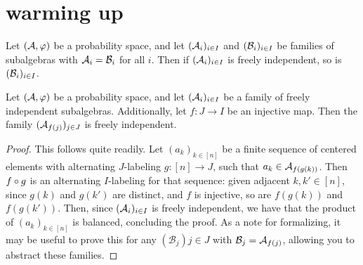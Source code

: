 \chapter{warming up}

\begin{lemma}
  \label{lem:freeIndep_congr}
  Let \((\mathcal{A},\varphi)\) be a probability space, and let \((\mathcal{A}_i)_{i\in I}\) and \((\mathcal{B}_i)_{i\in I}\) be
  families of subalgebras with \(\mathcal{A}_i = \mathcal{B}_i\) for all \(i\). Then if \((\mathcal{A}_i)_{i \in I}\) is freely
  independent, so is \((\mathcal{B}_i)_{i\in I}\).
\end{lemma}

\begin{lemma}
  \label{lem:freeIndep_of_inj}
  Let \((\mathcal{A},\varphi)\) be a probability space, and let \((\mathcal{A}_i)_{i\in I}\) be a family of
  freely independent subalgebras. Additionally, let \(f:J \rightarrow I\) be an injective map. Then the family
  \((\mathcal{A}_{f(j)})_{j\in J}\) is freely independent.
\end{lemma}
\begin{proof}
  This follows quite readily. Let \((a_k)_{k\in [n]}\) be a finite sequence of centered elements
  with alternating \(J\)-labeling \(g:[n]\rightarrow J\), such that \(a_k \in \mathcal{A}_{f(g(k))}\).
  Then \(f \circ g\) is an alternating \(I\)-labeling for that sequence: given adjacent \(k,k' \in [n]\),
  since \(g(k)\) and \(g(k')\) are distinct, and \(f\) is injective, so are \(f(g(k))\) and \(f(g(k'))\).
  Then, since \((\mathcal{A}_i)_{i\in I}\) is freely independent, we have that the product of \((a_k)_{k\in [n]}\)
  is balanced, concluding the proof. As a note for formalizing, it may be useful to prove this
  for any \((\mathcal{B}_j){j\in J}\) with \(\mathcal{B}_j = \mathcal{A}_{f(j)}\), allowing you to abstract these families.
\end{proof}
